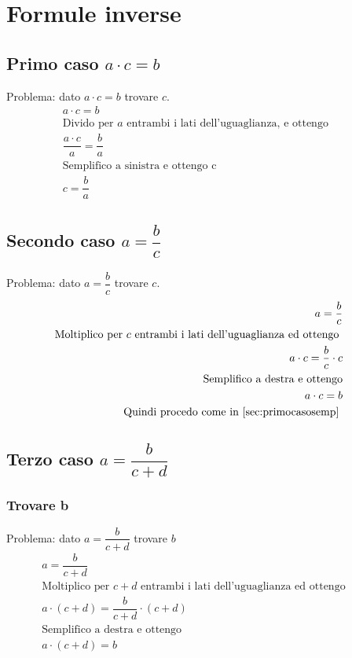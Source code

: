 \chapter{Formule inverse}
\label{cha:semplificazioni}
\minitoc
\mtcskip                                %
\minilof                                %
\mtcskip                                %
\minilot
\section[Primo caso]{Primo caso $a\cdot c=b$}
\label{sec:primocasosemp}
Problema: dato $a\cdot c=b$ trovare $c$.
\begin{align*}
a\cdot c=b&&\\
\text{Divido per $a$ entrambi i lati dell'uguaglianza, e ottengo}\\
\dfrac{a\cdot c}{a}=\dfrac{b}{a}&&\\
\text{Semplifico a sinistra e ottengo c}\\
c=\dfrac{b}{a}&&
\end{align*}
\section[Secondo caso]{Secondo caso $a=\dfrac{b}{c}$}
\label{sec:secondocasosemp}
Problema: dato $a=\dfrac{b}{c}$ trovare $c$.
\begin{align*}
a=\dfrac{b}{c}&&\\
\text{Moltiplico per $c$ entrambi i lati dell'uguaglianza ed ottengo }\\
a\cdot c=\dfrac{b}{c}\cdot c&&\\
\text{Semplifico a destra e ottengo}\\
a\cdot c=b&&\\
\text{Quindi procedo come in\nobs\ref{sec:primocasosemp} }
\end{align*}
\section[Terzo caso]{Terzo caso $a=\dfrac{b}{c+d}$}
\label{sec:terzocasosemp}
\subsection{Trovare b}
\label{sec:terzocasosemptrovareb}
Problema: dato $a=\dfrac{b}{c+d}$ trovare $b$
\begin{align*}
a=\dfrac{b}{c+d}&&\\
\text{Moltiplico per $c+d$ entrambi i lati dell'uguaglianza ed ottengo }\\
a\cdot (c+d)=\dfrac{b}{c+d}\cdot(c+d)&&\\
\text{Semplifico a destra e ottengo}\\
a\cdot (c+d)=b&&
\end{align*}
